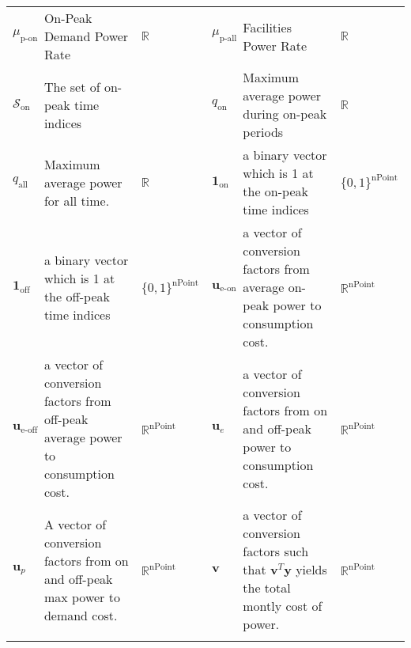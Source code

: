 \begin{supertabular}{b{0.06\textwidth} m{0.3\textwidth} m{0.09\textwidth} m{0.06\textwidth} m{0.3\textwidth} m{0.09\textwidth}}
	$\mu_{\text{p-on}}$         & On-Peak Demand Power Rate                                                      & $\mathbb{R}$                                & $\mu_{\text{p-all}}$       & Facilities Power Rate                                                                                    & $\mathbb{R}$                 \\ \myendline
	$\mathcal{S}_{\text{on}}$   & The set of on-peak time indices                                                &    & $q_{\text{on}}$            & Maximum average power during on-peak periods                                                             & $\mathbb{R}$                 \\ \myendline
	$q_{\text{all}}$            & Maximum average power for all time.                                            & $\mathbb{R}$                                & $\mathbf{1}_{\text{on}}$   & a binary vector which is 1 at the on-peak time indices                                                   & $\{0,1\}^{\text{nPoint}}$    \\ \myendline
	$\mathbf{1}_{\text{off}}$   & a binary vector which is 1 at the off-peak time indices                        & $\{0,1\}^{\text{nPoint}}$                   & $\mathbf{u}_{\text{e-on}}$ & a vector of conversion factors from average on-peak power to consumption cost.                           & $\mathbb{R}^{\text{nPoint}}$ \\ \myendline 
	$\mathbf{u}_{\text{e-off}}$ & a vector of conversion factors from off-peak average power to consumption cost.& $\mathbb{R}^{\text{nPoint}}$                & $\mathbf{u}_e$             & a vector of conversion factors from on and off-peak power to consumption cost.                           & $\mathbb{R}^{\text{nPoint}}$ \\ \myendline 
	$\mathbf{u}_p$              & A vector of conversion factors from on and off-peak max power to demand cost.  & $\mathbb{R}^{\text{nPoint}}$                & $\mathbf{v}$               & a vector of conversion factors such that $\mathbf{v}^T\mathbf{y}$ yields the total montly cost of power. & $\mathbb{R}^{\text{nPoint}}$ \\ \myendline
\end{supertabular}
\twocolumn
